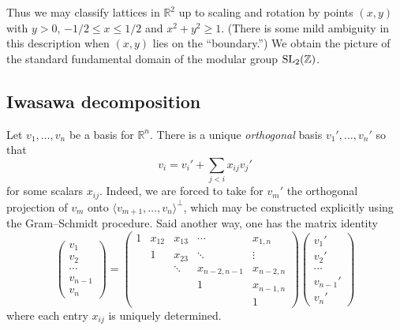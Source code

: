 \documentclass[reqno]{amsart} 
\begin{document}
Thus we may classify lattices in $\mathbb{R}^2$ up to scaling and rotation by points $(x,y)$ with $y > 0$, $-1/2 \leq x \leq 1/2$ and $x^2 + y^2 \geq 1$.  (There is some mild ambiguity in this description when $(x,y)$ lies on the ``boundary.'')  We obtain the picture of the standard fundamental domain of the modular group $\operatorname{SL}_2(\mathbb{Z})$.

\subsection{Iwasawa decomposition}
\label{sec:org485b167}
Let $v_1,\dotsc, v_n$ be a basis for $\mathbb{R}^n$.  There is a unique \emph{orthogonal} basis $v_1', \dotsc, v_n'$ so that
\begin{equation*}
  v_i = v_i' + \sum_{j < i} x_{i j} v_j'
\end{equation*}
for some scalars $x_{i j}$.  Indeed, we are forced to take for $v_m'$ the orthogonal projection of $v_m$ onto $\langle v_{m+1},\dotsc, v_n \rangle^\perp$, which may be constructed explicitly using the Gram--Schmidt procedure.  Said another way, one has the matrix identity
\begin{equation*}
  \begin{pmatrix}
    v_1  \\
    v_2  \\
    \dotsb  \\
    v_{n-1} \\
    v_n
  \end{pmatrix}
  =
  \begin{pmatrix}
    1 & x_{12} & x_{1 3} & \dotsb & x_{1, n} \\
      & 1 & x_{23}  & \ddots & \vdots \\
      &  & \ddots & x_{n-2,n-1} & x_{n-2,n} \\
      &  &  & 1 & x_{n-1, n}\\
      & & & & 1
  \end{pmatrix}
  \begin{pmatrix}
    v_1'  \\
    v_2'  \\
    \dotsb  \\
    v_{n-1}'  \\
    v _n '
  \end{pmatrix}
\end{equation*}
where each entry $x_{i j}$ is uniquely determined.
\end{document}
